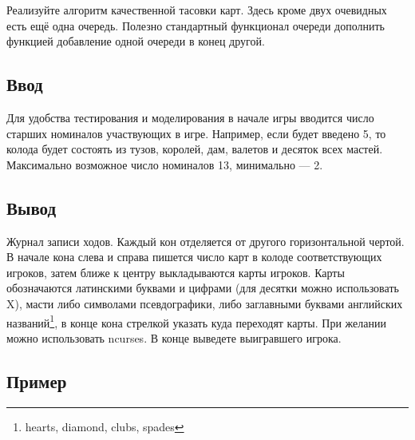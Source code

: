 \documentclass[12pt, oneside]{article}
\begin{document}
Реализуйте алгоритм качественной тасовки карт. Здесь кроме двух очевидных есть ещё одна очередь. Полезно стандартный функционал очереди дополнить функцией добавление одной очереди в конец другой.

\subsection*{Ввод}

Для удобства тестирования и моделирования в начале игры вводится число старших номиналов участвующих в игре. Например, если будет введено 5, то колода будет состоять из тузов, королей, дам, валетов и десяток всех мастей. Максимально возможное число номиналов 13, минимально --- 2.

\subsection*{Вывод}

Журнал записи ходов. Каждый кон отделяется от другого горизонтальной чертой. В начале кона слева и справа пишется число карт в колоде соответствующих игроков, затем ближе к центру выкладываются карты игроков. Карты обозначаются латинскими буквами и цифрами (для десятки можно использовать X), масти либо символами псевдографики, либо заглавными буквами английских названий\footnote{hearts, diamond, clubs, spades}, в конце кона стрелкой указать куда переходят карты. При желании можно использовать ncurses. В конце выведете выигравшего игрока. 

\subsection*{Пример}
\end{document}
